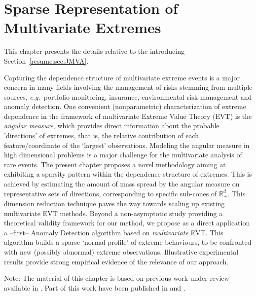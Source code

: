 \chapter{Sparse Representation of Multivariate Extremes}
\label{jmva}


\begin{chapabstract}
This chapter presents the details relative to the introducing Section~\ref{resume:sec:JMVA}.

Capturing the dependence structure of multivariate extreme events is
a major concern in many fields involving the management of risks
stemming from multiple sources, \emph{e.g.}~portfolio monitoring, insurance, environmental risk management and anomaly detection.
One convenient (nonparametric) characterization of  extreme dependence in the
framework of multivariate Extreme Value Theory (EVT) is the \textit{angular
  measure}, which provides direct information about the probable
'directions' of extremes, that is, the relative contribution of each
feature/coordinate of the `largest' observations. Modeling the
angular measure in high dimensional problems is a major challenge for
the multivariate analysis of rare events.
The present chapter proposes a novel methodology aiming at 
exhibiting a sparsity pattern within the dependence structure of extremes. 
This is achieved by estimating the amount of mass spread by the angular measure on
representative sets of directions, corresponding to  specific sub-cones of $\mathbb{R}_+^d$.
This dimension reduction technique  paves the way towards scaling up existing multivariate EVT methods.
Beyond a non-asymptotic study providing a theoretical validity
framework for our method, we propose  as a direct application a --first--
Anomaly Detection algorithm based on \textit{multivariate} EVT.  This algorithm builds a sparse `normal profile' of extreme behaviours, to be confronted with new (possibly abnormal) extreme observations. Illustrative experimental results provide strong empirical evidence of the relevance of our approach.
\end{chapabstract}

Note: The material of this chapter is based on previous work under review available in \cite{ARXIV16}. Part of this work have been published in \cite{AISTAT15} and \cite{NIPSWORKSHOP15}.



